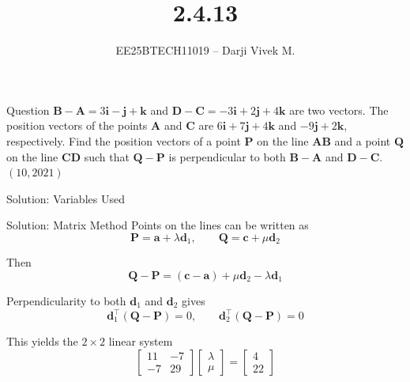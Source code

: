 \documentclass{beamer}
\title{2.4.13}
\author{EE25BTECH11019 -- Darji Vivek M.}
\date{}
\newcommand{\brak}[1]{\left( #1 \right)}
\renewcommand{\vec}[1]{\mathbf{#1}}
\begin{document}
\begin{frame}
  \titlepage
\end{frame}

\begin{frame}{Question}
$\vec{B}-\vec{A}=3\vec{i}-\vec{j}+\vec{k}$ and $\vec{D}-\vec{C}=-3\vec{i}+2\vec{j}+4\vec{k}$ are two vectors.  
The position vectors of the points $\vec{A}$ and $\vec{C}$ are $6\vec{i}+7\vec{j}+4\vec{k}$ and $-9\vec{j}+2\vec{k}$, respectively.  
Find the position vectors of a point $\vec{P}$ on the line $\vec{A}\vec{B}$ and a point $\vec{Q}$ on the line $\vec{C}\vec{D}$ such that $\vec{Q}-\vec{P}$ is perpendicular to both $\vec{B}-\vec{A}$ and $\vec{D}-\vec{C}$.  
\hfill $\brak{10,2021}$
\end{frame}

\begin{frame}{Solution: Variables Used}
\small

\end{frame}

\begin{frame}{Solution: Matrix Method}
\small
Points on the lines can be written as
\[
\vec{P}=\vec{a}+\lambda\vec{d}_1, \qquad
\vec{Q}=\vec{c}+\mu\vec{d}_2
\]

Then
\[
\vec{Q}-\vec{P}=(\vec{c}-\vec{a})+\mu\vec{d}_2-\lambda\vec{d}_1
\]

Perpendicularity to both $\vec{d}_1$ and $\vec{d}_2$ gives
\[
\vec{d}_1^{\top}(\vec{Q}-\vec{P})=0, \qquad
\vec{d}_2^{\top}(\vec{Q}-\vec{P})=0
\]

This yields the $2\times 2$ linear system
\[
\begin{bmatrix}
11 & -7 \\ 
-7 & 29
\end{bmatrix}
\begin{bmatrix}
\lambda \\ \mu
\end{bmatrix}
=
\begin{bmatrix}
4 \\ 22
\end{bmatrix}
\]
\end{frame}
\end{document}
